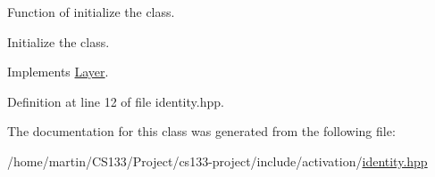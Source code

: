 Function of initialize the class. 

Initialize the class. 

Implements \hyperlink{class_layer_aab662b9c8e61cd7375cbb4413d2e3037}{Layer}.



Definition at line 12 of file identity.\+hpp.



The documentation for this class was generated from the following file\+:\begin{DoxyCompactItemize}
\item 
/home/martin/\+C\+S133/\+Project/cs133-\/project/include/activation/\hyperlink{_identity_8hpp}{identity.\+hpp}\end{DoxyCompactItemize}
